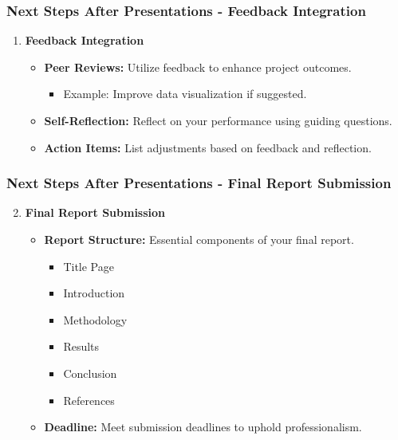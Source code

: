 \documentclass{beamer}
\begin{document}
\begin{frame}[fragile]
    \frametitle{Next Steps After Presentations - Feedback Integration}
    \begin{enumerate}
        \item \textbf{Feedback Integration}
        \begin{itemize}
            \item \textbf{Peer Reviews:} Utilize feedback to enhance project outcomes.
            \begin{itemize}
                \item Example: Improve data visualization if suggested.
            \end{itemize}
            \item \textbf{Self-Reflection:} Reflect on your performance using guiding questions.
            \item \textbf{Action Items:} List adjustments based on feedback and reflection.
        \end{itemize}
    \end{enumerate}
\end{frame}

\begin{frame}[fragile]
    \frametitle{Next Steps After Presentations - Final Report Submission}
    \begin{enumerate}
        \setcounter{enumi}{1} %
        \item \textbf{Final Report Submission}
        \begin{itemize}
            \item \textbf{Report Structure:} Essential components of your final report.
            \begin{itemize}
                \item Title Page
                \item Introduction
                \item Methodology
                \item Results
                \item Conclusion
                \item References
            \end{itemize}
            \item \textbf{Deadline:} Meet submission deadlines to uphold professionalism.
        \end{itemize}
    \end{enumerate}
\end{frame}
\end{document}
